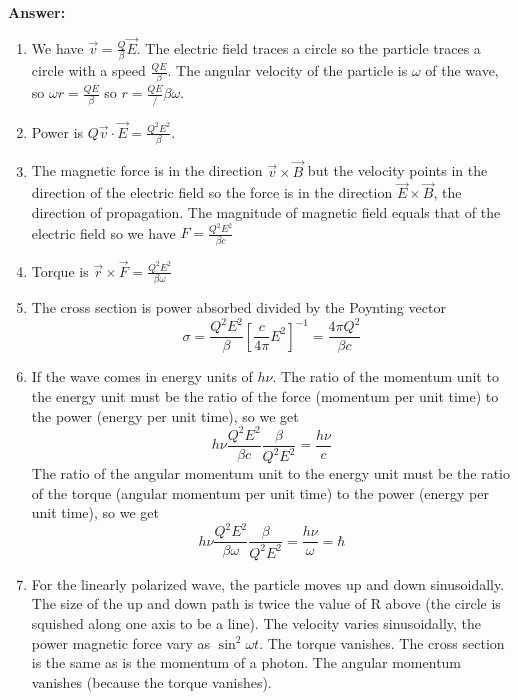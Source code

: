 \documentclass{article}
\begin{document}
\begin{enumerate}
{\bf Answer:}

\begin{enumerate}
\item
 We have ${\vec v} = \frac{Q}{\beta} {\vec E}$.  The electric field traces a circle so the 
particle traces a circle with a speed $\frac{QE}{\beta}$.  The angular velocity of the particle is $\omega$ of the wave, so $\omega r=\frac{QE}{\beta}$ so $r=\frac{QE}/{\beta\omega}$.

\item Power is $Q{\vec v}\cdot {\vec E} = \frac{Q^2 E^2}{\beta}$.

\item The magnetic force is in the direction ${\vec v}\times {\vec B}$ but the velocity points in the
direction of the electric field so the force is in the direction ${\vec E}\times {\vec B}$, the direction of propagation.   The magnitude of magnetic field equals that of the electric field so we have
$F = \frac{Q^2 E^2}{\beta c}$

\item Torque is ${\vec r} \times {\vec F} = \frac{Q^2 E^2}{\beta \omega}$ 

\item The cross section is power absorbed divided by the Poynting vector 
\begin{equation}
\sigma = \frac{Q^2 E^2}{\beta} \left [ \frac{c}{4\pi} E^2 \right ]^{-1} = \frac{4 \pi Q^2}{\beta c}
\end{equation}

\item If the wave comes in energy units of $h\nu$.  The ratio of the momentum unit to the energy unit must 
be the ratio of the force (momentum per unit time) to the power (energy per unit time), so we get
\begin{equation}
h\nu \frac{Q^2 E^2}{\beta c} \frac{\beta}{Q^2 E^2} = \frac{h\nu}{c}
\end{equation}
The ratio of the angular momentum unit to the energy unit must be the
ratio of the torque (angular momentum per unit time) to the power
(energy per unit time), so we get
\begin{equation}
h\nu \frac{Q^2 E^2}{\beta \omega} \frac{\beta}{Q^2 E^2} = \frac{h\nu}{\omega} = \hbar
\end{equation}
\item For the linearly polarized wave, the particle moves up and down sinusoidally.  The size of the up and down path is twice the value of R above (the circle is squished along one axis to be a line).  The velocity varies sinusoidally, the power magnetic force vary as $\sin^2 \omega t$.  The torque vanishes.  The cross section is the same as is the momentum of a photon.  The angular momentum vanishes (because the torque vanishes).
\end{enumerate}



\end{enumerate}
\end{document}
